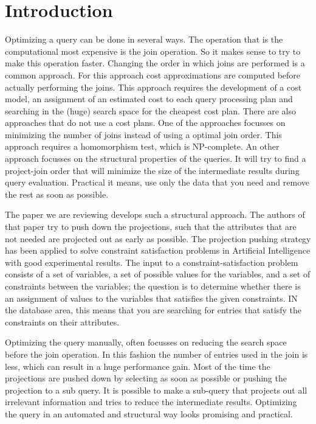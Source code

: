 \section{Introduction} \label{sec:Introduction}
Optimizing a query can be done in several ways. The operation that is the computational most expensive is the join operation. So it makes sense to try to make this operation faster. Changing the order in which joins are performed is a common approach. For this approach cost approximations are computed before actually performing the joins. This approach requires  the development of a cost model, an assignment of an estimated cost to each query processing plan and searching in the (huge) search space for the cheapest cost plan. There are also approaches that do not use a cost plans. One of the approaches focusses on minimizing the number of joins instead of using a optimal join order. This approach requires a homomorphism test, which is NP-complete. An other approach focusses on the structural properties of the queries. It will try to find a project-join order that will minimize the size of the intermediate results during query evaluation. Practical it means, use only the data that you need and remove the rest as soon as possible. 

The paper we are reviewing develops such a structural approach. The authors of that paper try to push down the projections, such that the attributes that are not needed are projected out as early as possible. The projection pushing strategy has been applied to solve constraint satisfaction problems in Artificial Intelligence with good experimental results. The input to a constraint-satisfaction problem consists of a set of variables, a set of possible values for the variables, and a set of constraints between the variables; the question is to determine whether there is an assignment of values to the variables that satisfies the given constraints. IN the database area, this means that you are searching for entries that satisfy the constraints on their attributes. 

Optimizing the query manually, often focusses on reducing the search space before the join operation. In this fashion the number of entries used in the join is less, which can result in a huge performance gain. Most of the time the projections are pushed down by selecting as soon as possible or pushing the projection to a sub query. It is possible to make a sub-query that projects out all irrelevant information and tries to reduce the intermediate results. Optimizing the query in an automated and structural way looks promising and practical. 